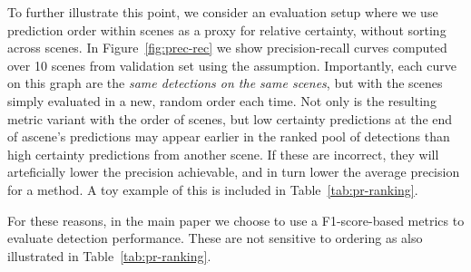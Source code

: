 To further illustrate this point, we consider an evaluation setup where we use prediction order within scenes as a proxy for relative certainty, without sorting across scenes. In Figure~\ref{fig:prec-rec} we show precision-recall curves computed over 10 scenes from \DatasetName{} validation set using the assumption. Importantly, each curve on this graph are the \textit{same detections on the same scenes}, but with the scenes simply evaluated in a new, random order each time. Not only is the resulting metric variant with the order of scenes, but low certainty predictions at the end of ascene's predictions may appear earlier in the ranked pool of detections than high certainty predictions from another scene. If these are incorrect, they will arteficially lower the precision achievable, and in turn lower the average precision for a method. A toy example of this is included in Table~\ref{tab:pr-ranking}.

For these reasons, in the main paper we choose to use a F1-score-based metrics to evaluate detection performance. These are not sensitive to ordering as also illustrated in Table~\ref{tab:pr-ranking}.

